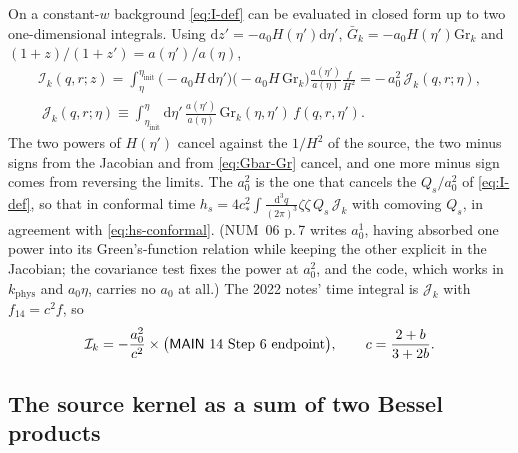 \documentclass[11pt,a4paper]{article}
\newcommand{\dd}{\mathrm{d}}
\newcommand{\Gr}{\mathrm{Gr}}
\newcommand{\Gb}{\bar{G}}
\newcommand{\etainit}{\eta_{\mathrm{init}}}
\newcommand{\cstar}{c_{*}}
\newcommand{\kphys}{k_{\mathrm{phys}}}
\newcommand{\note}[1]{\textsf{#1}}
\theoremstyle{remark}
\begin{document}
On a constant-$w$ background \eqref{eq:I-def} can be evaluated in closed form up to two one-dimensional integrals. Using $\dd z' = -a_0H(\eta')\dd\eta'$, $\Gb_k = -a_0H(\eta')\Gr_k$ and $(1+z)/(1+z') = a(\eta')/a(\eta)$,
\begin{equation}
\begin{gathered}
\mathcal{I}_k(q,r;z) = \int_{\eta}^{\etainit}\big(-a_0H\,\dd\eta'\big)\big(-a_0H\,\Gr_k\big)\frac{a(\eta')}{a(\eta)}\frac{f}{H^2}
= -\,a_0^2\,\mathcal{J}_k(q,r;\eta),\\[4pt]
\boxed{\;\mathcal{J}_k(q,r;\eta)\equiv\int_{\etainit}^{\eta}\dd\eta'\,\frac{a(\eta')}{a(\eta)}\,\Gr_k(\eta,\eta')\,f(q,r,\eta').\;}
\end{gathered}
\label{eq:I-J}
\end{equation}
The two powers of $H(\eta')$ cancel against the $1/H^2$ of the source, the two minus signs from the Jacobian and from \eqref{eq:Gbar-Gr} cancel, and one more minus sign comes from reversing the limits. The $a_0^2$ is the one that cancels the $Q_s/a_0^2$ of \eqref{eq:I-def}, so that in conformal time $h_s = 4\cstar^2\int\frac{\dd^3q}{(2\pi)^3}\zeta\zeta\,Q_s\,\mathcal{J}_k$ with comoving $Q_s$, in agreement with \eqref{eq:hs-conformal}. (\note{NUM}~06 p.\,7 writes $a_0^1$, having absorbed one power into its Green's-function relation while keeping the other explicit in the Jacobian; the covariance test fixes the power at $a_0^2$, and the code, which works in $\kphys$ and $a_0\eta$, carries no $a_0$ at all.) The 2022 notes' time integral is $\mathcal{J}_k$ with $f_{14} = c^2f$, so
\begin{equation}
\mathcal{I}_k = -\frac{a_0^2}{c^2}\times\big(\text{\note{MAIN}~14 Step 6 endpoint}\big),\qquad c = \frac{2+b}{3+2b}.
\label{eq:I-target}
\end{equation}

\subsection{The source kernel as a sum of two Bessel products}
\label{sec:f-bessel}
\end{document}
